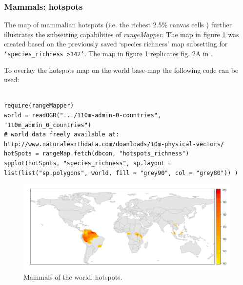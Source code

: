 \documentclass[ a4paper ]{article}
\newenvironment{Rcode}
{\begin{list}{}{\setlength{\leftmargin}{1em}}\item\scriptsize\bfseries}
{\end{list}}
\begin{document}
 \subsubsection{Mammals: hotspots}
The map of mammalian hotspots (i.e. the richest 2.5\% canvas cells \cite{orme05} ) further illustrates the subsetting capabilities of \emph{rangeMapper}. The map in figure \ref{fig:map1e}  was created based on the previously saved `species richness' map subsetting for  \texttt{`species\_richness >142'}. The map in figure \ref{fig:map1e} replicates fig. 2A in \cite{ceballos06}.

To overlay the hotspots map on the world base-map the following code can be used:

\begin{Rcode}
\begin{verbatim}

require(rangeMapper)
world = readOGR(".../110m-admin-0-countries", "110m_admin_0_countries")
# world data freely available at: http://www.naturalearthdata.com/downloads/10m-physical-vectors/ 
hotSpots = rangeMap.fetch(dbcon, "hotspots_richness")
spplot(hotSpots, "species_richness", sp.layout = list(list("sp.polygons", world, fill = "grey90", col = "grey80")) )
\end{verbatim}
\end{Rcode}




 \begin{figure}[htbp]
  \begin{center}
	\includegraphics[width=1\linewidth]{map1e}
    \caption{\label{fig:map1e} Mammals of the world: hotspots.}
  \end{center}
\end{figure}
\end{document}
